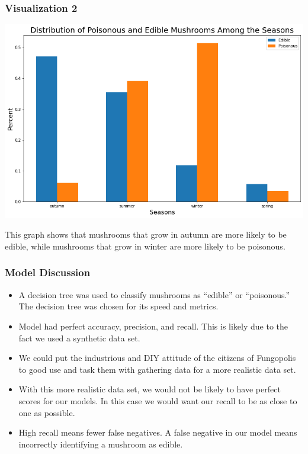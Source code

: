 \documentclass[]{beamer}
\begin{document}
\begin{frame}
\frametitle{Visualization 2}
\begin{center}
\includegraphics[scale = 0.3]{toxicity_by_season.png}
\end{center}

\pause
This graph shows that mushrooms that grow in autumn are more likely to be edible, while mushrooms that grow in winter are more likely to be poisonous.
\end{frame}


\begin{frame}
\frametitle{Model Discussion}
\begin{itemize}
\pause
\item A decision tree was used to classify mushrooms as ``edible'' or ``poisonous.'' The decision tree was chosen for its speed and metrics.
\pause
\item Model had perfect accuracy, precision, and recall. This is likely due to the fact we used a synthetic data set.
\pause
\item We could put the industrious and DIY attitude of the citizens of Fungopolis to good use and task them with gathering data for a more realistic data set. 
\pause
\item With this more realistic data set, we would not be likely to have perfect scores for our models. In this case we would want our recall to be as close to one as possible.
\pause
\item High recall means fewer false negatives. A false negative in our model means incorrectly identifying a mushroom as edible.
\end{itemize}
\end{frame}
\end{document}
